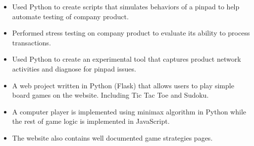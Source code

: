 \documentclass[10pt,a4paper]{altacv}
\begin{document}

\begin{fullwidth}
\makecvheader
\end{fullwidth}



\begin{itemize}
\item Used Python to create scripts that simulates behaviors of a pinpad to help automate testing of company product.
\item Performed stress testing on company product to evaluate its ability to process transactions.
\item Used Python to create an experimental tool that captures product network activities and diagnose for pinpad issues.
\end{itemize}



\begin{itemize}
    \item A web project written in Python (Flask) that allows users to play simple board games on the website. Including Tic Tac Toe and Sudoku.
    \item A computer player is implemented using minimax algorithm in Python while the rest of game logic is implemented in JavaScript.
    \item The website also contains well documented game strategies pages.
\end{itemize}
\end{document}
